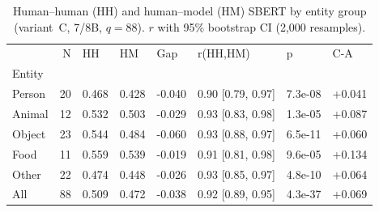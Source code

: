 \begin{table}[t]
\centering
\caption{Human--human (HH) and human--model (HM) SBERT by entity group (variant~C, 7/8B, $q=88$). $r$ with 95\% bootstrap CI (2{,}000 resamples).}
\label{tab:hh_hm_entity}
\small
\begin{tabular}{lrllllll}
\toprule
 & N & HH & HM & Gap & r(HH,HM) & p & C-A \\
Entity &  &  &  &  &  &  &  \\
\midrule
Person & 20 & 0.468 & 0.428 & -0.040 & 0.90 [0.79, 0.97] & 7.3e-08 & +0.041 \\
Animal & 12 & 0.532 & 0.503 & -0.029 & 0.93 [0.83, 0.98] & 1.3e-05 & +0.087 \\
Object & 23 & 0.544 & 0.484 & -0.060 & 0.93 [0.88, 0.97] & 6.5e-11 & +0.060 \\
Food & 11 & 0.559 & 0.539 & -0.019 & 0.91 [0.81, 0.98] & 9.6e-05 & +0.134 \\
Other & 22 & 0.474 & 0.448 & -0.026 & 0.93 [0.85, 0.97] & 4.8e-10 & +0.064 \\
All & 88 & 0.509 & 0.472 & -0.038 & 0.92 [0.89, 0.95] & 4.3e-37 & +0.069 \\
\bottomrule
\end{tabular}
\end{table}
